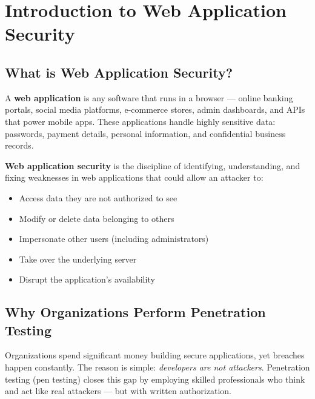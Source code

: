 \chapter{Introduction to Web Application Security}
\label{ch:intro}


\section{What is Web Application Security?}

A \textbf{web application} is any software that runs in a browser --- online banking portals, social media platforms, e-commerce stores, admin dashboards, and APIs that power mobile apps. These applications handle highly sensitive data: passwords, payment details, personal information, and confidential business records.

\textbf{Web application security} is the discipline of identifying, understanding, and fixing weaknesses in web applications that could allow an attacker to:

\begin{itemize}[leftmargin=*]
  \item Access data they are not authorized to see
  \item Modify or delete data belonging to others
  \item Impersonate other users (including administrators)
  \item Take over the underlying server
  \item Disrupt the application's availability
\end{itemize}


\section{Why Organizations Perform Penetration Testing}

Organizations spend significant money building secure applications, yet breaches happen constantly. The reason is simple: \textit{developers are not attackers}. Penetration testing (pen testing) closes this gap by employing skilled professionals who think and act like real attackers --- but with written authorization.

